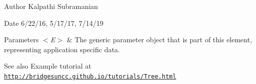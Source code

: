 \begin{DoxyAuthor}{Author}
Kalpathi Subramanian
\end{DoxyAuthor}
\begin{DoxyDate}{Date}
6/22/16, 5/17/17, 7/14/19
\end{DoxyDate}

\begin{DoxyParams}{Parameters}
{\em $<$\+E$>$} & The generic parameter object that is part of this element, representing application specific data.\\
\hline
\end{DoxyParams}
\begin{DoxySeeAlso}{See also}
Example tutorial at \href{http://bridgesuncc.github.io/tutorials/Tree.html}{\tt http\+://bridgesuncc.\+github.\+io/tutorials/\+Tree.\+html} 
\end{DoxySeeAlso}
